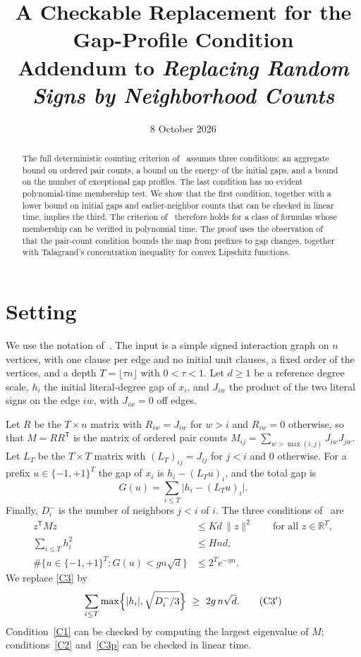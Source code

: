 \documentclass[11pt,a4paper]{article}
\title{A Checkable Replacement for the Gap-Profile Condition\\
\large Addendum to \emph{Replacing Random Signs by Neighborhood Counts}}
\author{}
\date{8 October 2026}
\theoremstyle{remark}
\begin{document}
\maketitle

\begin{abstract}
The full deterministic counting criterion of~\cite{CC} assumes three
conditions: an aggregate bound on ordered pair counts, a bound on the energy
of the initial gaps, and a bound on the number of exceptional gap profiles.
The last condition has no evident polynomial-time membership test. We show
that the first condition, together with a lower bound on initial gaps and
earlier-neighbor counts that can be checked in linear time, implies the third.
The criterion of~\cite{CC} therefore holds for a class of formulas whose
membership can be verified in polynomial time. The proof uses the observation
of~\cite{CC} that the pair-count condition bounds the map from prefixes to gap
changes, together with Talagrand's concentration inequality for convex
Lipschitz functions.
\end{abstract}

\section{Setting}

We use the notation of~\cite[Section~3]{CC}. The input is a simple signed
interaction graph on $n$ vertices, with one clause per edge and no initial unit
clauses, a fixed order of the vertices, and a depth $T=\lfloor\tau n\rfloor$
with $0<\tau<1$. Let $d\ge1$ be a reference degree scale, $h_i$ the initial
literal-degree gap of $x_i$, and $J_{iw}$ the product of the two literal signs
on the edge $iw$, with $J_{iw}=0$ off edges.

Let $R$ be the $T\times n$ matrix with $R_{iw}=J_{iw}$ for $w>i$ and
$R_{iw}=0$ otherwise, so that $M=RR^{\mathsf T}$ is the matrix of ordered pair
counts $M_{ij}=\sum_{w>\max(i,j)}J_{iw}J_{jw}$. Let $L_T$ be the $T\times T$
matrix with $(L_T)_{ij}=J_{ij}$ for $j<i$ and $0$ otherwise. For a prefix
$u\in\{-1,+1\}^T$ the gap of $x_i$ is $h_i-(L_Tu)_i$, and the total gap is
\[
 G(u)=\sum_{i\le T}\bigl|h_i-(L_Tu)_i\bigr| .
\]
Finally, $D_i^-$ is the number of neighbors $j<i$ of $i$. The three conditions
of~\cite{CC} are
\begin{align}
 z^{\mathsf T}Mz&\le Kd\,\|z\|^2\qquad\text{for all }z\in\mathbb R^T,
 \tag{C1}\label{C1}\\
 \sum_{i\le T}h_i^2&\le Hnd,\tag{C2}\label{C2}\\
 \#\{u\in\{-1,+1\}^T:G(u)<gn\sqrt d\}&\le2^Te^{-\eta n}.
 \tag{C3}\label{C3}
\end{align}
We replace \eqref{C3} by
\begin{equation}
 \sum_{i\le T}\max\Bigl\{|h_i|,\sqrt{D_i^-/3}\Bigr\}\ \ge\ 2g\,n\sqrt d .
 \tag{C3$'$}\label{C3p}
\end{equation}
Condition~\eqref{C1} can be checked by computing the largest eigenvalue of
$M$; conditions~\eqref{C2} and~\eqref{C3p} can be checked in linear time.
\end{document}
